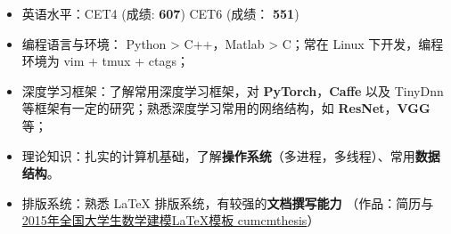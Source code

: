 \documentclass[paper=a4,fontsize=11pt,svgnames]{temp} %
\begin{document}
\noindent
\vspace*{-.9cm}
\hspace*{0cm}
\begin{minipage}{.96\textwidth}
\begin{itemize}
	\item 英语水平：CET4 (成绩: \textbf{607}) \hspace*{1cm} CET6 (成绩： \textbf{551})
	\item 编程语言与环境： Python > C++，Matlab > C；常在 Linux 下开发，编程环境为 vim + tmux + ctags；
	\item 深度学习框架：了解常用深度学习框架，对 \textbf{PyTorch}，\textbf{Caffe} 以及 TinyDnn 等框架有一定的研究；熟悉深度学习常用的网络结构，如 \textbf{ResNet}，\textbf{VGG}等；%
	\item 理论知识：扎实的计算机基础，了解\textbf{操作系统}（多进程，多线程）、常用\textbf{数据结构}。
	\item 排版系统：熟悉 \LaTeX{} 排版系统，有较强的\textbf{文档撰写能力} （作品：简历与
	\href{http://www.latexstudio.net/archives/4200}{2015年全国大学生数学建模LaTeX模板 cumcmthesis}）
\end{itemize}
\end{minipage}

\end{document}
